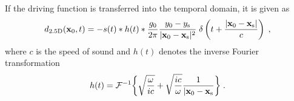 \documentclass{article}
\begin{document}
If the driving function 
is transferred into the temporal domain,
it is given as
\begin{equation}
    d_{\text{2.5D}}( \mathbf{x} _0,t) = -s(t) * h(t) *
    \frac{g_0}{2\pi}
    \frac{y_0 - y_\text{s}}{| \mathbf{x} _0- \mathbf{x} _\text{s}|^{2}}
    \;\delta\left(t + \frac{| \mathbf{x} _0- \mathbf{x} _\text{s}|}{c}\right)
    \;,
\label{eq:d}
\end{equation}
where $c$ is the speed of sound and
$h(t)$ denotes the inverse Fourier transformation
\begin{equation} 
    h(t) =
    \mathcal{F}^{-1}{\biggl\{ \sqrt{\frac{\omega}{ic}} + \sqrt{\frac{ic}{\omega}}
    \frac{1}{| \mathbf{x} _0- \mathbf{x} _\text{s}} \biggr\}} 
    \;.
    \label{eq:h}
\end{equation}
\end{document}

